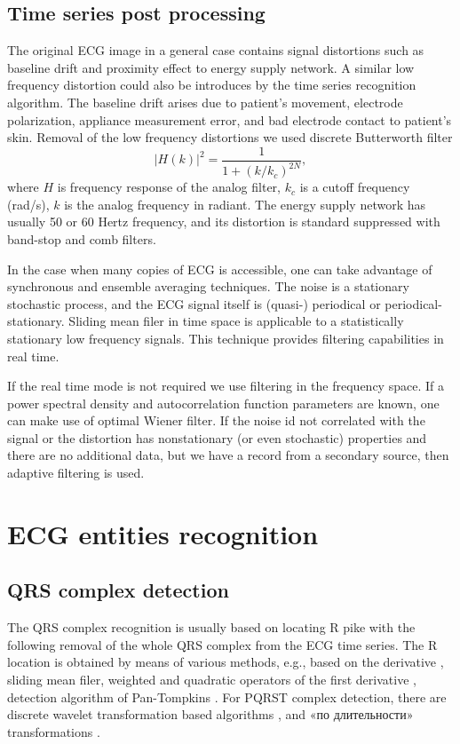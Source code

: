 \documentclass[runningheads]{AIIT}
\newcommand{\nnn}[2][rcolor]{\noindent%
\textcolor{eclr}{}\textcolor{#1}{#2}\textcolor{eclr}{}}
\begin{document}
\subsection{Time series post processing}
\label{sec:cleaning-artefacts}

The original ECG image in a general case contains signal distortions such as baseline drift and proximity effect to energy supply network.  A similar low frequency distortion could also be introduces by the time series recognition algorithm.  The baseline drift arises due to patient's movement, electrode polarization, appliance measurement error, and bad electrode contact to patient's skin.  Removal of the low frequency distortions we used discrete Butterworth filter
$$
|H(k)|^2=\frac{1}{1+(k/k_c)^{2N}},
$$
where $H$ is frequency response of the analog filter, $k_c$ is a cutoff frequency (rad/s), $k$ is the analog frequency in radiant.  The energy supply network has usually 50 or 60 Hertz frequency, and its distortion is standard suppressed with band-stop and comb filters.

In the case when many copies of ECG is accessible, one can take advantage of synchronous and ensemble averaging techniques.  The noise is a stationary stochastic process, and the ECG signal itself is (quasi-) periodical or periodical-stationary.  Sliding mean filer in time space is applicable to a statistically stationary low frequency signals.  This technique provides filtering capabilities in real time.

If the real time mode is not required we use filtering in the frequency space.  If a power spectral density and autocorrelation function parameters are known, one can make use of optimal Wiener filter.  If the noise id not correlated with the signal or the distortion has nonstationary (or even stochastic) properties and there are no additional data, but we have a record from a secondary source, then adaptive filtering is used.

\section{ECG entities recognition}
\label{sec:ecg-etit-recogn}

\subsection{QRS complex detection}
\label{sec:qrs-compl-detect}

The QRS complex recognition is usually based on locating R pike with the following removal of the whole QRS complex from the ECG time series.  The R location is obtained by means of various methods, e.g., based on the derivative \cite{2}, sliding mean filer, weighted and quadratic operators of the first derivative \cite{3}, detection algorithm of Pan-Tompkins \cite{4}.  For PQRST complex detection, there are discrete wavelet transformation based algorithms \cite{5,6}, and \nnn{«по длительности»} transformations \cite{7}.
\end{document}
